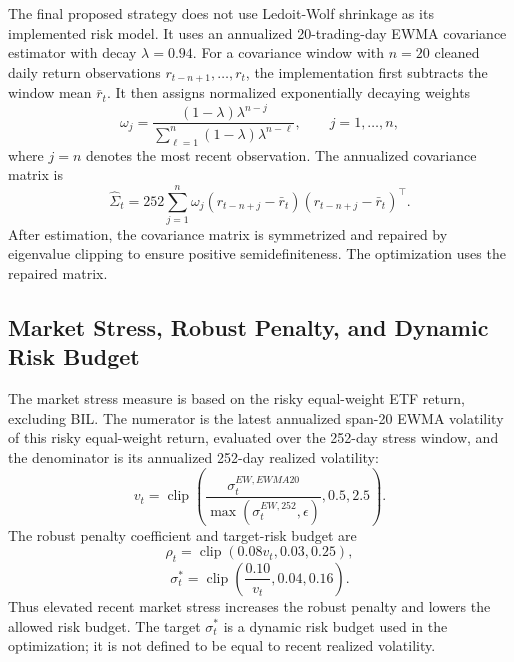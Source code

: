 \documentclass[11pt]{article}
\begin{document}
The final proposed strategy does not use Ledoit-Wolf shrinkage as its implemented
risk model. It uses an annualized 20-trading-day EWMA covariance estimator with
decay \(\lambda=0.94\). For a covariance window with \(n=20\) cleaned daily return
observations \(r_{t-n+1},\ldots,r_t\), the implementation first subtracts the window
mean \(\bar r_t\). It then assigns normalized exponentially decaying weights
\begin{equation}
\omega_j=\frac{(1-\lambda)\lambda^{n-j}}
{\sum_{\ell=1}^{n}(1-\lambda)\lambda^{n-\ell}},
\qquad j=1,\ldots,n,
\end{equation}
where \(j=n\) denotes the most recent observation. The annualized covariance matrix
is
\begin{equation}
\hat{\Sigma}_t
=252\sum_{j=1}^{n}\omega_j
\left(r_{t-n+j}-\bar r_t\right)
\left(r_{t-n+j}-\bar r_t\right)^\top .
\end{equation}
After estimation, the covariance matrix is symmetrized and repaired by eigenvalue
clipping to ensure positive semidefiniteness. The optimization uses the repaired
matrix.

\subsection{Market Stress, Robust Penalty, and Dynamic Risk Budget}

The market stress measure is based on the risky equal-weight ETF return, excluding
BIL. The numerator is the latest annualized span-20 EWMA volatility of this risky
equal-weight return, evaluated over the 252-day stress window, and the denominator
is its annualized 252-day realized volatility:
\begin{equation}
v_t=\operatorname{clip}\left(
\frac{\sigma^{EW,EWMA20}_t}{\max(\sigma^{EW,252}_t,\epsilon)},0.5,2.5
\right).
\end{equation}
The robust penalty coefficient and target-risk budget are
\begin{equation}
\rho_t=\operatorname{clip}(0.08v_t,0.03,0.25),
\end{equation}
\begin{equation}
\sigma_t^*=\operatorname{clip}\left(\frac{0.10}{v_t},0.04,0.16\right).
\end{equation}
Thus elevated recent market stress increases the robust penalty and lowers the
allowed risk budget. The target \(\sigma_t^*\) is a dynamic risk budget used in the
optimization; it is not defined to be equal to recent realized volatility.
\end{document}
